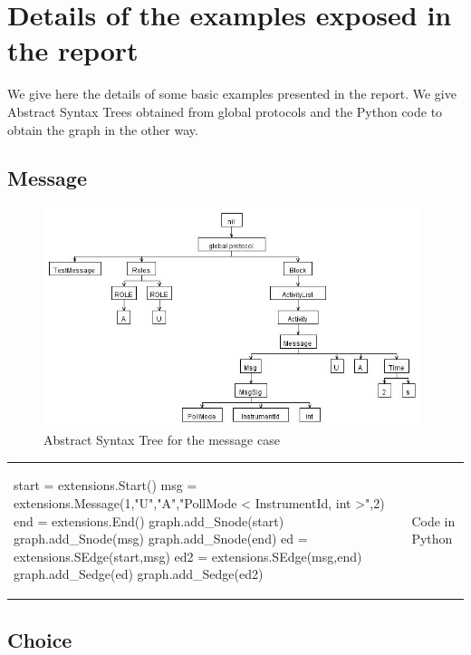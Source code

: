\documentclass[a4paper,11pt,twoside]{report}
\begin{document}





\listoffigures

\listoftables


\appendix

\chapter{Details of the examples exposed in the report}
We give here the details of some basic examples presented in the report. We give Abstract Syntax Trees obtained from global protocols and the Python code to obtain the graph in the other way.

\section{Message}
\begin{figure}[h]
\begin{center}
\includegraphics[width=11cm]{messageAST}\caption{Abstract Syntax Tree for the message case}
\end{center}
\label{fig:Message}
\end{figure}
\begin{tabular}{ll}
\begin{SJLISTING}
start = extensions.Start()
msg = extensions.Message(1,"U","A","PollMode < InstrumentId, int >",2)
end = extensions.End()
graph.add_Snode(start)
graph.add_Snode(msg)
graph.add_Snode(end)
ed = extensions.SEdge(start,msg)
ed2 = extensions.SEdge(msg,end)
graph.add_Sedge(ed)
graph.add_Sedge(ed2)
\end{SJLISTING}
&  Code in Python
\end{tabular}




\section{Choice}
\end{document}
